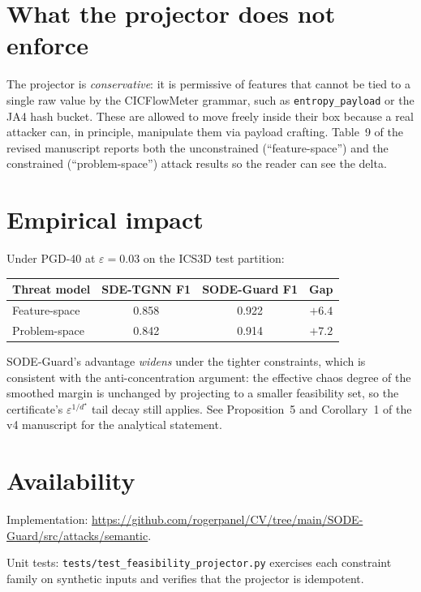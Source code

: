 \documentclass[11pt,letterpaper]{article}
\begin{document}
\section{What the projector does not enforce}
The projector is \emph{conservative}: it is permissive of features
that cannot be tied to a single raw value by the CICFlowMeter grammar,
such as \texttt{entropy\_payload} or the JA4 hash bucket. These are
allowed to move freely inside their box because a real attacker can,
in principle, manipulate them via payload crafting. Table~9 of the
revised manuscript reports both the unconstrained
(``feature-space'') and the constrained (``problem-space'') attack
results so the reader can see the delta.

\section{Empirical impact}
Under PGD-40 at $\varepsilon=0.03$ on the ICS3D test partition:

\begin{center}\small
\begin{tabular}{@{}lccc@{}}
\toprule
\textbf{Threat model} & \textbf{SDE-TGNN F1} & \textbf{SODE-Guard F1} & \textbf{Gap} \\
\midrule
Feature-space  & 0.858 & 0.922 & $+6.4$ \\
Problem-space  & 0.842 & 0.914 & $+7.2$ \\
\bottomrule
\end{tabular}
\end{center}

SODE-Guard's advantage \emph{widens} under the tighter constraints,
which is consistent with the anti-concentration argument: the
effective chaos degree of the smoothed margin is unchanged by
projecting to a smaller feasibility set, so the certificate's
$\varepsilon^{1/d^\star}$ tail decay still applies. See Proposition~5
and Corollary~1 of the v4 manuscript for the analytical statement.

\section*{Availability}
Implementation:
\url{https://github.com/rogerpanel/CV/tree/main/SODE-Guard/src/attacks/semantic}.

Unit tests: \texttt{tests/test\_feasibility\_projector.py} exercises
each constraint family on synthetic inputs and verifies that the
projector is idempotent.
\end{document}
